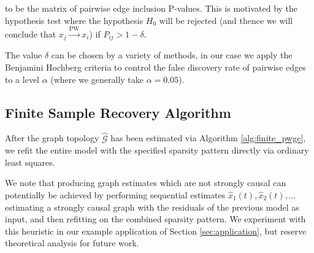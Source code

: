 \documentclass[12pt]{article}
\def\pwgc{\overset{\text{PW}}{\rightarrow}}  %
\def\gcg{\mathcal{G}}  %
\begin{document}
to be the matrix of pairwise edge inclusion P-values.  This is
motivated by the hypothesis test where the hypothesis $H_0$ will be
rejected (and thence we will conclude that $x_j \pwgc x_i$) if
$P_{ij} > 1 - \delta$.

The value $\delta$ can be chosen by a variety of methods, in our case
we apply the Benjamini Hochberg criteria \cite{benjamini_hochberg}
\cite{all_of_statistics} to control the false discovery rate of
pairwise edges to a level $\alpha$ (where we generally take
$\alpha = 0.05$).

\subsection{Finite Sample Recovery Algorithm}
\label{sec:finite_pwgc}

After the graph topology $\widehat{\gcg}$ has been estimated via
Algorithm \ref{alg:finite_pwgc}, we refit the entire model with the
specified sparsity pattern directly via ordinary least squares.

We note that producing graph estimates which are not strongly causal
can potentially be achieved by performing sequential estimates
$\widehat{x}_1(t), \widehat{x}_2(t), \ldots$ estimating a strongly causal
graph with the residuals of the previous model as input, and then
refitting on the combined sparsity pattern.  We experiment with this
heuristic in our example application of Section \ref{sec:application},
but reserve theoretical analysis for future work.
\end{document}
